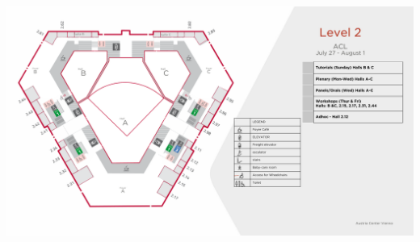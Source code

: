 \vspace*{0.2cm}
\includegraphics[width=1.0\linewidth]{examples/acl25-handbook/venue_map/acl25_map-4.pdf}
\newpage